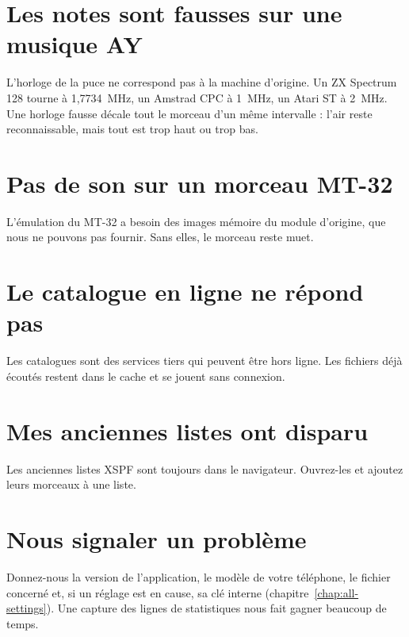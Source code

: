 \section{Les notes sont fausses sur une musique AY}
L'horloge de la puce ne correspond pas à la machine d'origine. Un ZX Spectrum 128 tourne à 1,7734~MHz, un Amstrad CPC
à 1~MHz, un Atari ST à 2~MHz. Une horloge fausse décale tout le morceau d'un même intervalle : l'air reste
reconnaissable, mais tout est trop haut ou trop bas.

\section{Pas de son sur un morceau MT-32}
L'émulation du MT-32 a besoin des images mémoire du module d'origine, que nous ne pouvons pas fournir. Sans elles,
le morceau reste muet.

\section{Le catalogue en ligne ne répond pas}
Les catalogues sont des services tiers qui peuvent être hors ligne. Les fichiers déjà écoutés restent dans le cache
et se jouent sans connexion.

\section{Mes anciennes listes ont disparu}
Les anciennes listes XSPF sont toujours dans le navigateur. Ouvrez-les et ajoutez leurs morceaux à une liste.

\section{Nous signaler un problème}
Donnez-nous la version de l'application, le modèle de votre téléphone, le fichier concerné et, si un réglage est en
cause, sa clé interne (chapitre~\ref{chap:all-settings}). Une capture des lignes de statistiques nous fait gagner
beaucoup de temps.
